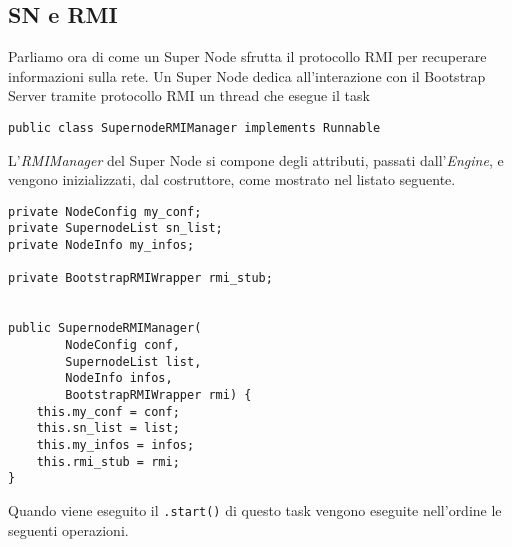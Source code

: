 \subsection{SN e RMI}
Parliamo ora di come un Super Node sfrutta il protocollo RMI per recuperare informazioni sulla rete.
Un Super Node dedica all'interazione con il Bootstrap Server tramite protocollo RMI un thread che esegue il task
\begin{verbatim}
public class SupernodeRMIManager implements Runnable
\end{verbatim}
L'\emph{RMIManager} del Super Node si compone degli attributi, passati dall'\emph{Engine}, e vengono inizializzati, dal costruttore, come mostrato nel listato seguente.
\begin{lstlisting}
private NodeConfig my_conf;
private SupernodeList sn_list;
private NodeInfo my_infos;

private BootstrapRMIWrapper rmi_stub;


public SupernodeRMIManager(
		NodeConfig conf,
		SupernodeList list,
		NodeInfo infos,
		BootstrapRMIWrapper rmi) {
	this.my_conf = conf;
	this.sn_list = list;
	this.my_infos = infos;
	this.rmi_stub = rmi;
}
\end{lstlisting}
Quando viene eseguito il \verb|.start()| di questo task vengono eseguite nell'ordine le seguenti operazioni.
